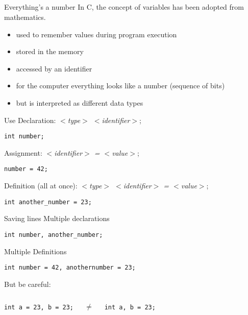 \subsection{}
\begin{frame}{Everything's a number}
	In C, the concept of variables has been adopted from mathematics.
	\begin{itemize}
		\item used to remember values during program execution
		\item stored in the memory
		\item accessed by an identifier
		\item for the computer everything looks like a number (sequence of bits)
		\item but is interpreted as different data types
	\end{itemize}
\end{frame}
\begin{frame}[fragile]{Use}
	Declaration: \textit{$<$type$>$ $<$identifier$>$};
	\begin{lstlisting}[numbers=none,belowskip=-1em]
	int number;
\end{lstlisting}
	Assignment: \textit{$<$identifier$>$ = $<$value$>$};
	\begin{lstlisting}[numbers=none,belowskip=-1em]
	number = 42;
\end{lstlisting}
	Definition (all at once): \textit{$<$type$>$ $<$identifier$>$ = $<$value$>$};
	\begin{lstlisting}[numbers=none]
	int another_number = 23;
\end{lstlisting}
\end{frame}
\begin{frame}[fragile]{Saving lines}
	Multiple declarations
	\begin{lstlisting}[numbers=none,belowskip=-1em]
	int number, another_number;
\end{lstlisting}
	Multiple Definitions
	\begin{lstlisting}[numbers=none, belowskip=0em]
	int number = 42, anothernumber = 23;
\end{lstlisting}
But be careful:
\begin{columns}[c]
	\begin{lstlisting}[numbers=none]
int a = 23, b = 23;
\end{lstlisting}
	\centering
	$\neq$
	\begin{lstlisting}[numbers=none]
int a, b = 23;
\end{lstlisting}
	
\end{columns}
\end{frame}
